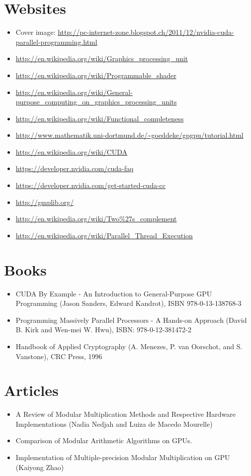 \documentclass[12pt, a4paper]{report}
\begin{document}
\section{Websites}
\begin{itemize}
\item Cover image: \url{http://pc-internet-zone.blogspot.ch/2011/12/nvidia-cuda-parallel-programming.html}
\item \url{http://en.wikipedia.org/wiki/Graphics_processing_unit}
\item \url{http://en.wikipedia.org/wiki/Programmable_shader}
\item \url{http://en.wikipedia.org/wiki/General-purpose_computing_on_graphics_processing_units}
\item \url{http://en.wikipedia.org/wiki/Functional_completeness}
\item \url{http://www.mathematik.uni-dortmund.de/~goeddeke/gpgpu/tutorial.html}
\item \url{http://en.wikipedia.org/wiki/CUDA}
\item \url{https://developer.nvidia.com/cuda-faq}
\item \url{https://developer.nvidia.com/get-started-cuda-cc}
\item \url{http://gmplib.org/}
\item \url{http://en.wikipedia.org/wiki/Two%27s_complement}
\item \url{http://en.wikipedia.org/wiki/Parallel_Thread_Execution}
\end{itemize}

\section{Books}
\begin{itemize}
\item CUDA By Example - An Introduction to General-Purpose GPU Programming
(Jason Sanders, Edward Kandrot), ISBN 978-0-13-138768-3
\item Programming Massively Parallel Processors - A Hands-on Approach (David B. Kirk and Wen-mei W. Hwu), ISBN: 978-0-12-381472-2
\item Handbook of Applied Cryptography (A. Menezes, P. van Oorschot, and S. Vanstone), CRC Press, 1996
\end{itemize}

\section{Articles}
\begin{itemize}
\item A Review of Modular Multiplication Methods and Respective Hardware Implementations (Nadia Nedjah and Luiza de Macedo Mourelle)
\item{Comparison of Modular Arithmetic Algorithms on GPUs.}
\item{Implementation of Multiple-precision Modular Multiplication on GPU (Kaiyong Zhao)}
\end{itemize}
\end{document}
